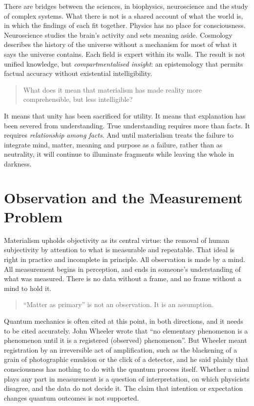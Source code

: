\documentclass[11pt,a4paper]{article}
\begin{document}
There are bridges between the sciences, in biophysics, neuroscience and the study of complex systems. What there is not is a shared account of what the world is, in which the findings of each fit together. Physics has no place for consciousness. Neuroscience studies the brain's activity and sets meaning aside. Cosmology describes the history of the universe without a mechanism for most of what it says the universe contains. Each field is expert within its walls. The result is not unified knowledge, but \textit{compartmentalised insight}: an epistemology that permits factual accuracy without existential intelligibility.

\begin{quote}
What does it mean that materialism has made reality more comprehensible, but less intelligible?
\end{quote}

It means that unity has been sacrificed for utility. It means that explanation has been severed from understanding. True understanding requires more than facts. It requires \textit{relationship among facts}. And until materialism treats the failure to integrate mind, matter, meaning and purpose as a failure, rather than as neutrality, it will continue to illuminate fragments while leaving the whole in darkness.

\section{Observation and the Measurement Problem}
\label{sec:measurement}

Materialism upholds objectivity as its central virtue: the removal of human subjectivity by attention to what is measurable and repeatable. That ideal is right in practice and incomplete in principle. All observation is made by a mind. All measurement begins in perception, and ends in someone's understanding of what was measured. There is no data without a frame, and no frame without a mind to hold it.

\begin{quote}
``Matter as primary'' is not an observation. It is an assumption.
\end{quote}

Quantum mechanics is often cited at this point, in both directions, and it needs to be cited accurately. John Wheeler wrote that ``no elementary phenomenon is a phenomenon until it is a registered (observed) phenomenon''. But Wheeler meant registration by an irreversible act of amplification, such as the blackening of a grain of photographic emulsion or the click of a detector, and he said plainly that consciousness has nothing to do with the quantum process itself. Whether a mind plays any part in measurement is a question of interpretation, on which physicists disagree, and the data do not decide it. The claim that intention or expectation changes quantum outcomes is not supported.
\end{document}

